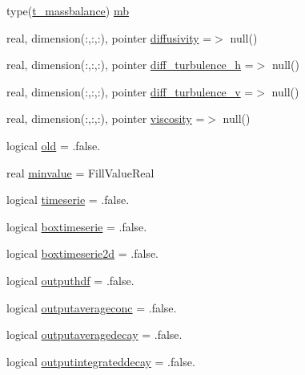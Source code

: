 \begin{DoxyCompactItemize}
type(\mbox{\hyperlink{structmoduleporousmediaproperties_1_1t__massbalance}{t\+\_\+massbalance}}) \mbox{\hyperlink{structmoduleporousmediaproperties_1_1t__property_a53b28a67af1b81a35d2b58eb00eacab9}{mb}}
\item 
real, dimension(\+:,\+:,\+:), pointer \mbox{\hyperlink{structmoduleporousmediaproperties_1_1t__property_a9772be32924489b6a991a71729dd283b}{diffusivity}} =$>$ null()
\item 
real, dimension(\+:,\+:,\+:), pointer \mbox{\hyperlink{structmoduleporousmediaproperties_1_1t__property_a26778def88b24541921dc25869c5f4d1}{diff\+\_\+turbulence\+\_\+h}} =$>$ null()
\item 
real, dimension(\+:,\+:,\+:), pointer \mbox{\hyperlink{structmoduleporousmediaproperties_1_1t__property_aac2fc14d72ad4844498ffeb6b4b68f1c}{diff\+\_\+turbulence\+\_\+v}} =$>$ null()
\item 
real, dimension(\+:,\+:,\+:), pointer \mbox{\hyperlink{structmoduleporousmediaproperties_1_1t__property_ae69f37999655a64f02b320ab199e9439}{viscosity}} =$>$ null()
\item 
logical \mbox{\hyperlink{structmoduleporousmediaproperties_1_1t__property_a5bd68ae276a8fc0d65f2b654231f6c8f}{old}} = .false.
\item 
real \mbox{\hyperlink{structmoduleporousmediaproperties_1_1t__property_a8ed3a7c7ddeef62fd82996db1135c12f}{minvalue}} = Fill\+Value\+Real
\item 
logical \mbox{\hyperlink{structmoduleporousmediaproperties_1_1t__property_a1343a00e5e3a528cf3475e12d9edc88d}{timeserie}} = .false.
\item 
logical \mbox{\hyperlink{structmoduleporousmediaproperties_1_1t__property_a292959bc536ff70be8b3f2faee8fa95e}{boxtimeserie}} = .false.
\item 
logical \mbox{\hyperlink{structmoduleporousmediaproperties_1_1t__property_a14b6a211a3cba13ac52945a563a890ba}{boxtimeserie2d}} = .false.
\item 
logical \mbox{\hyperlink{structmoduleporousmediaproperties_1_1t__property_a9a40d9ca56149f4de967444d284ea4ee}{outputhdf}} = .false.
\item 
logical \mbox{\hyperlink{structmoduleporousmediaproperties_1_1t__property_adaa5c22594e0b6fc6f3136ff99d30172}{outputaverageconc}} = .false.
\item 
logical \mbox{\hyperlink{structmoduleporousmediaproperties_1_1t__property_ae5e9674a8244bea502823a44ced95b05}{outputaveragedecay}} = .false.
\item 
logical \mbox{\hyperlink{structmoduleporousmediaproperties_1_1t__property_a31ea5e7cc66c6b41b6c50bb7374a6199}{outputintegrateddecay}} = .false.

\end{DoxyCompactItemize}
